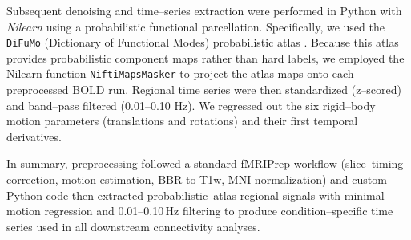 Subsequent denoising and time–series extraction were performed in Python with \emph{Nilearn} \cite{nilearn} using a probabilistic functional parcellation. Specifically, we used the \texttt{DiFuMo} (Dictionary of Functional Modes) probabilistic atlas \cite{dadi2020fine}. Because this atlas provides probabilistic component maps rather than hard labels, we employed the Nilearn function \texttt{NiftiMapsMasker} to project the atlas maps onto each preprocessed BOLD run. Regional time series were then standardized (z–scored) and band–pass filtered (0.01–0.10 Hz). We regressed out the six rigid–body motion parameters (translations and rotations) and their first temporal derivatives. 

In summary, preprocessing followed a standard fMRIPrep workflow (slice–timing correction, motion estimation, BBR to T1w, MNI normalization) and custom Python code then extracted probabilistic–atlas regional signals with minimal motion regression and 0.01–0.10\,Hz filtering to produce condition–specific time series used in all downstream connectivity analyses.


